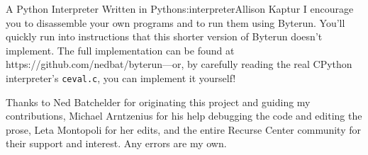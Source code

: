 \begin{aosachapter}{A Python Interpreter Written in Python}{s:interpreter}{Allison Kaptur}
I encourage you to disassemble your own programs and to run them using
Byterun. You'll quickly run into instructions that this shorter version
of Byterun doesn't implement. The full implementation can be found at
https://github.com/nedbat/byterun---or, by carefully reading the real
CPython interpreter's \texttt{ceval.c}, you can implement it yourself!

\label{acknowledgements}

Thanks to Ned Batchelder for originating this project and guiding my
contributions, Michael Arntzenius for his help debugging the code and
editing the prose, Leta Montopoli for her edits, and the entire Recurse
Center community for their support and interest. Any errors are my own.

\end{aosachapter}
